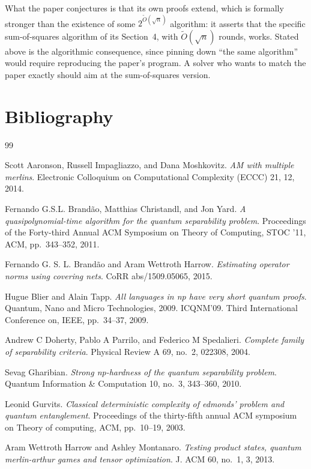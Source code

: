 \documentclass{aicr-conjecture}
\newcommand{\tO}{\tilde{O}}
\begin{document}
\begin{remark}\label{rem:sosform}
What the paper conjectures is that its own proofs extend, which is
formally stronger than the existence of some $2^{\tO(\sqrt{n})}$
algorithm: it asserts that the specific sum-of-squares algorithm of its
Section~4, with $\tO(\sqrt{n})$ rounds, works. Stated above is the
algorithmic consequence, since pinning down ``the same algorithm''
would require reproducing the paper's program. A solver who wants to
match the paper exactly should aim at the sum-of-squares version.
\end{remark}

\section{Bibliography}

\begin{aicrbibliography}{99}

Scott Aaronson, Russell Impagliazzo, and Dana Moshkovitz.
\emph{AM with multiple merlins}.
Electronic Colloquium on Computational Complexity (ECCC) 21, 12, 2014.

Fernando G.S.L. Brand\~{a}o, Matthias Christandl, and Jon Yard.
\emph{A quasipolynomial-time algorithm for the quantum separability
problem}.
Proceedings of the Forty-third Annual ACM Symposium on Theory of
Computing, STOC '11, ACM, pp.\ 343--352, 2011.

Fernando G. S. L. Brand\~{a}o and Aram Wettroth Harrow.
\emph{Estimating operator norms using covering nets}.
CoRR abs/1509.05065, 2015.

Hugue Blier and Alain Tapp.
\emph{All languages in np have very short quantum proofs}.
Quantum, Nano and Micro Technologies, 2009. ICQNM'09. Third
International Conference on, IEEE, pp.\ 34--37, 2009.

Andrew C Doherty, Pablo A Parrilo, and Federico M Spedalieri.
\emph{Complete family of separability criteria}.
Physical Review A 69, no.\ 2, 022308, 2004.

Sevag Gharibian.
\emph{Strong np-hardness of the quantum separability problem}.
Quantum Information \& Computation 10, no.\ 3, 343--360, 2010.

Leonid Gurvits.
\emph{Classical deterministic complexity of edmonds' problem and quantum
entanglement}.
Proceedings of the thirty-fifth annual ACM symposium on Theory of
computing, ACM, pp.\ 10--19, 2003.

Aram Wettroth Harrow and Ashley Montanaro.
\emph{Testing product states, quantum merlin-arthur games and tensor
optimization}.
J. ACM 60, no.\ 1, 3, 2013.

\end{aicrbibliography}
\end{document}
